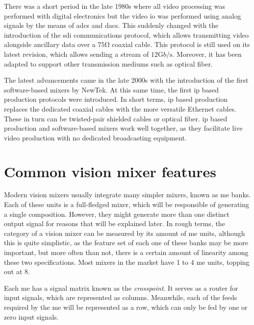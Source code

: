 \documentclass[../main.tex]{subfiles}
\begin{document}
There was a short period in the late 1980s where all video processing was performed with digital electronics but the video \gls{io} was performed using analog signals by the means of \glspl{adc} and \glspl{dac}. This suddenly changed with the introduction of the \gls{sdi} communications protocol, which allows transmitting video alongside ancillary data over a $75 \si{\ohm}$ coaxial cable\cite{ortizrodriguez2018}. This protocol is still used on its latest revision, which allows sending a stream of $12 \si{\giga b \per\second}$. Moreover, it has been adapted to support other transmission mediums such as optical fiber.\newline

The latest advancements came in the late 2000s with the introduction of the first software-based mixers by NewTek. At this same time, the first \gls{ip} based production protocols were introduced. In short terms, \gls{ip} based production replaces the dedicated coaxial cables with the more versatile Ethernet cables. These in turn can be twisted-pair shielded cables or optical fiber. \Gls{ip} based production and software-based mixers work well together, as they facilitate live video production with no dedicated broadcasting equipment.\newline


\section{Common vision mixer features}
Modern vision mixers usually integrate many simpler mixers, known as \gls{me} banks. Each of these units is a full-fledged mixer, which will be responsible of generating a single composition. However, they might generate more than one distinct output signal for reasons that will be explained later. In rough terms, the category of a vision mixer can be measured by its amount of \gls{me} units, although this is quite simplistic, as the feature set of each one of these banks may be more important, but more often than not, there is a certain amount of linearity among these two specifications. Most mixers in the market have 1 to 4 \gls{me} units, topping out at 8.\newline

Each \gls{me} has a signal matrix known as the \textit{crosspoint}. It serves as a router for input signals, which are represented as columns. Meanwhile, each of the feeds required by the \gls{me} will be represented as a row, which can only be fed by one or zero input signals.\newline
\end{document}
